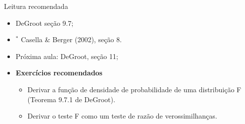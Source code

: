 \begin{frame}{Leitura recomendada}
\begin{itemize}
 \item[\faBook] DeGroot seção 9.7;
 \item[\faBook] $^\ast$ Casella \& Berger (2002), seção 8.
 \item[\faForward] Próxima aula: DeGroot, seção 11;
 \item {\large\textbf{Exercícios recomendados}}
  \begin{itemize}
   \item[\faBookmark] Derivar a função de densidade de probabilidade de uma distribuição F (Teorema 9.7.1 de DeGroot).
   \item[\faBookmark] Derivar o teste F como um teste de razão de verossimilhanças.
  \end{itemize}
 \end{itemize} 
\end{frame}
